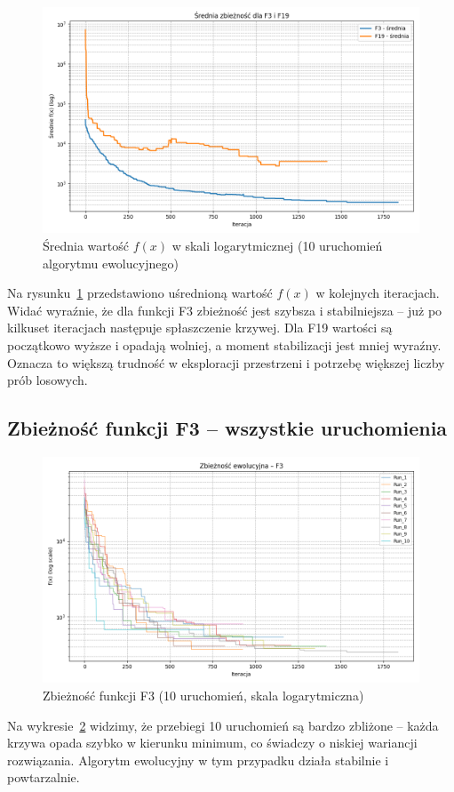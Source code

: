 \documentclass[a4paper]{article}
\begin{document}
\begin{figure}[H]
    \centering
    \includegraphics[width=0.6\linewidth]{avg_convergence_plot.png}
    \caption{Średnia wartość \(f(x)\) w skali logarytmicznej (10 uruchomień algorytmu ewolucyjnego)}
    \label{fig:avg_convergence}
\end{figure}

Na rysunku~\ref{fig:avg_convergence} przedstawiono uśrednioną wartość \(f(x)\) w kolejnych iteracjach.  
Widać wyraźnie, że dla funkcji F3 zbieżność jest szybsza i stabilniejsza – już po kilkuset iteracjach następuje spłaszczenie krzywej.  
Dla F19 wartości są początkowo wyższe i opadają wolniej, a moment stabilizacji jest mniej wyraźny.  
Oznacza to większą trudność w eksploracji przestrzeni i potrzebę większej liczby prób losowych.

\subsection{Zbieżność funkcji F3 – wszystkie uruchomienia}

\begin{figure}[H]
    \centering
    \includegraphics[width=0.6\linewidth]{F3_log_plot.png}
    \caption{Zbieżność funkcji F3 (10 uruchomień, skala logarytmiczna)}
    \label{fig:f3log}
\end{figure}

Na wykresie~\ref{fig:f3log} widzimy, że przebiegi 10 uruchomień są bardzo zbliżone – każda krzywa opada szybko w kierunku minimum, co świadczy o niskiej wariancji rozwiązania.  
Algorytm ewolucyjny w tym przypadku działa stabilnie i powtarzalnie.
\end{document}
